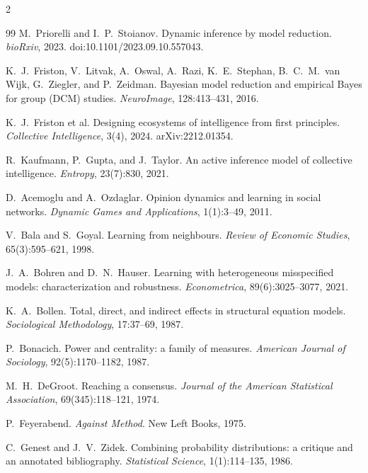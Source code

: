 \documentclass[11pt]{article}
\begin{document}
\begin{multicols}{2}
\begin{thebibliography}{99}
M.~Priorelli and I.~P.~Stoianov.
Dynamic inference by model reduction.
\emph{bioRxiv}, 2023. doi:10.1101/2023.09.10.557043.

K.~J.~Friston, V.~Litvak, A.~Oswal, A.~Razi, K.~E.~Stephan, B.~C.~M.~van Wijk, G.~Ziegler, and
P.~Zeidman. Bayesian model reduction and empirical {Bayes} for group ({DCM}) studies.
\emph{NeuroImage}, 128:413--431, 2016.

K.~J.~Friston et al.
Designing ecosystems of intelligence from first principles.
\emph{Collective Intelligence}, 3(4), 2024. arXiv:2212.01354.

R.~Kaufmann, P.~Gupta, and J.~Taylor.
An active inference model of collective intelligence.
\emph{Entropy}, 23(7):830, 2021.

D.~Acemoglu and A.~Ozdaglar.
Opinion dynamics and learning in social networks.
\emph{Dynamic Games and Applications}, 1(1):3--49, 2011.

V.~Bala and S.~Goyal.
Learning from neighbours. \emph{Review of Economic Studies}, 65(3):595--621, 1998.

J.~A.~Bohren and D.~N.~Hauser.
Learning with heterogeneous misspecified models: characterization and robustness.
\emph{Econometrica}, 89(6):3025--3077, 2021.

K.~A.~Bollen.
Total, direct, and indirect effects in structural equation models.
\emph{Sociological Methodology}, 17:37--69, 1987.

P.~Bonacich.
Power and centrality: a family of measures.
\emph{American Journal of Sociology}, 92(5):1170--1182, 1987.

M.~H.~DeGroot.
Reaching a consensus. \emph{Journal of the American Statistical Association}, 69(345):118--121, 1974.

P.~Feyerabend.
\emph{Against Method}. New Left Books, 1975.

C.~Genest and J.~V.~Zidek.
Combining probability distributions: a critique and an annotated bibliography.
\emph{Statistical Science}, 1(1):114--135, 1986.


\end{thebibliography}
\end{multicols}
\end{document}
